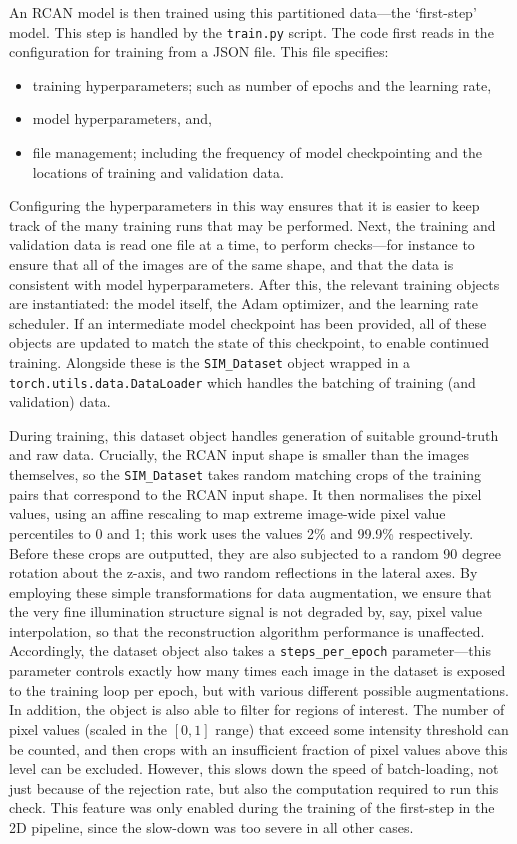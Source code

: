 \documentclass[12pt]{article}
\begin{document}
An RCAN model is then trained using this partitioned data---the `first-step' model.
This step is handled by the \texttt{train.py} script.
The code first reads in the configuration for training from a JSON file.
This file specifies:
\begin{itemize}
    \item training hyperparameters; such as number of epochs and the learning rate,
    \item model hyperparameters, and,
    \item file management; including the frequency of model checkpointing and the locations of training and validation data.
\end{itemize}
Configuring the hyperparameters in this way ensures that it is easier to keep track of the many training runs that may be performed.
Next, the training and validation data is read one file at a time, to perform checks---for instance to ensure that all of the images are of the same shape,
and that the data is consistent with model hyperparameters.
After this, the relevant training objects are instantiated: the model itself, the Adam optimizer, and the learning rate scheduler.
If an intermediate model checkpoint has been provided, all of these objects are updated to match the state of this checkpoint,
to enable continued training.
Alongside these is the \texttt{SIM\_Dataset} object wrapped in a \texttt{torch.utils.data.DataLoader} which handles the batching of training (and validation) data.

During training, this dataset object handles generation of suitable ground-truth and raw data.
Crucially, the RCAN input shape is smaller than the images themselves,
so the \texttt{SIM\_Dataset} takes random matching crops of the training pairs that correspond to the RCAN input shape.
It then normalises the pixel values, using an affine rescaling to map extreme image-wide pixel value percentiles to 0 and 1;
this work uses the values 2\% and 99.9\% respectively.
Before these crops are outputted, they are also subjected to a random 90 degree rotation about the z-axis,
and two random reflections in the lateral axes.
By employing these simple transformations for data augmentation,
we ensure that the very fine illumination structure signal is not degraded by, say, pixel value interpolation,
so that the reconstruction algorithm performance is unaffected.
Accordingly, the dataset object also takes a \texttt{steps\_per\_epoch} parameter---this
parameter controls exactly how many times each image in the dataset is exposed to the training loop per epoch,
but with various different possible augmentations.
In addition, the object is also able to filter for regions of interest.
The number of pixel values (scaled in the $[0, 1]$ range) that exceed some intensity threshold can be counted,
and then crops with an insufficient fraction of pixel values above this level can be excluded.
However, this slows down the speed of batch-loading, not just because of the rejection rate,
but also the computation required to run this check.
This feature was only enabled during the training of the first-step in the 2D pipeline,
since the slow-down was too severe in all other cases.
\end{document}
